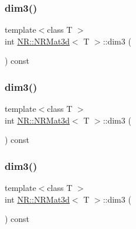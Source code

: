\mbox{\label{classNR_1_1NRMat3d_aec8af45aa2025ea53f2967a79d0fe233}} 
\subsubsection{\texorpdfstring{dim3()}{dim3()}\hspace{0.1cm}{\footnotesize\ttfamily [1/3]}}
{\footnotesize\ttfamily template$<$class T $>$ \\
int \mbox{\hyperlink{classNR_1_1NRMat3d}{N\+R\+::\+N\+R\+Mat3d}}$<$ T $>$\+::dim3 (\begin{DoxyParamCaption}{ }\end{DoxyParamCaption}) const\hspace{0.3cm}{\ttfamily [inline]}}

\mbox{\label{classNR_1_1NRMat3d_aec8af45aa2025ea53f2967a79d0fe233}} 
\subsubsection{\texorpdfstring{dim3()}{dim3()}\hspace{0.1cm}{\footnotesize\ttfamily [2/3]}}
{\footnotesize\ttfamily template$<$class T $>$ \\
int \mbox{\hyperlink{classNR_1_1NRMat3d}{N\+R\+::\+N\+R\+Mat3d}}$<$ T $>$\+::dim3 (\begin{DoxyParamCaption}{ }\end{DoxyParamCaption}) const\hspace{0.3cm}{\ttfamily [inline]}}

\mbox{\label{classNR_1_1NRMat3d_aec8af45aa2025ea53f2967a79d0fe233}} 
\subsubsection{\texorpdfstring{dim3()}{dim3()}\hspace{0.1cm}{\footnotesize\ttfamily [3/3]}}
{\footnotesize\ttfamily template$<$class T $>$ \\
int \mbox{\hyperlink{classNR_1_1NRMat3d}{N\+R\+::\+N\+R\+Mat3d}}$<$ T $>$\+::dim3 (\begin{DoxyParamCaption}{ }\end{DoxyParamCaption}) const\hspace{0.3cm}{\ttfamily [inline]}}

